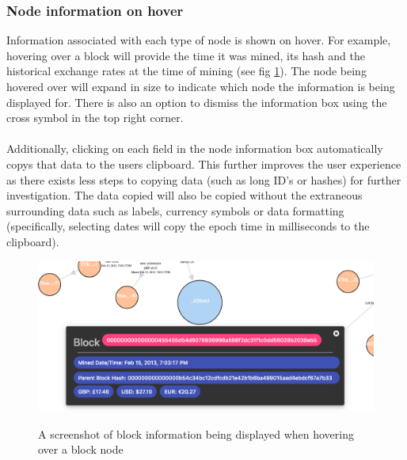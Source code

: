 \subsubsection{Node information on hover}
Information associated with each type of node is shown on hover. For example, hovering over a block will provide the time it was mined, its hash and the historical exchange rates at the time of mining (see fig \ref{fig:block-info-on-hover}). The node being hovered over will expand in size to indicate which node the information is being displayed for. There is also an option to dismiss the information box using the cross symbol in the top right corner. 
\\\\
Additionally, clicking on each field in the node information box automatically copys that data to the users clipboard. This further improves the user experience as there exists less steps to copying data (such as long ID's or hashes) for further investigation. The data copied will also be copied without the extraneous surrounding data such as labels, currency symbols or data formatting (specifically, selecting dates will copy the epoch time in milliseconds to the clipboard). 

\begin{figure}[h!]
  \centering
  \includegraphics[width = 15cm]{./figures/ui-screenshots/block-info}\\[0.5cm] 
  \caption{A screenshot of block information being displayed when hovering over a block node}
  \label{fig:block-info-on-hover}
\end{figure}

